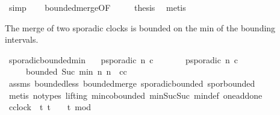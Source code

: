 \begin{isabellebody}
\ simp\isanewline
\ \ \isamarkupfalse%
\ bounded{\isacharunderscore}merge{\isacharbrackleft}OF\ {}\ {}\ {}{\isacharbrackright}\ \isamarkupfalse%
\ {\isacharquery}thesis\ \isamarkupfalse%
\ metis\isanewline
{}\isamarkupfalse%
%
\endisatagproof
{\isafoldproof}%
%
\isadelimproof
%
\endisadelimproof
%
\isadelimdocument
%
\endisadelimdocument
%
\isatagdocument
%
\isamarkuptrue%
%
\endisatagdocument
{\isafolddocument}%
%
\isadelimdocument
%
\endisadelimdocument
%
\begin{isamarkuptext}%
The merge of two sporadic clocks is bounded on the min of the bounding intervals.%
\end{isamarkuptext}\isamarkuptrue%
\isamarkupfalse%
\ sporadic{\isacharunderscore}bounded{\isacharunderscore}min{\isacharcolon}\isanewline
\ \ \ {\isacartoucheopen}p{\isacharunderscore}sporadic\ n\ c{\isacartoucheclose}\isanewline
\ \ \ \ \ \ \ {\isacartoucheopen}p{\isacharunderscore}sporadic\ n{\isacharprime}\ c{\isacharprime}{\isacartoucheclose}\isanewline
\ \ \ \ \ {\isacartoucheopen}bounded\ {\isacharparenleft}Suc\ {\isacharparenleft}min\ n\ n{\isacharprime}{\isacharparenright}{\isacharparenright}\ {}\ {\isacharparenleft}c{\isasymoplus}c{\isacharprime}{\isacharparenright}{\isacartoucheclose}\isanewline
%
\isadelimproof
%
\endisadelimproof
%
\isatagproof
{}\isamarkupfalse%
\ assms\ bounded{\isacharunderscore}less\ bounded{\isacharunderscore}merge\ sporadic{\isacharunderscore}bounded{}\ spor{\isacharunderscore}bounded\isanewline
{}\isamarkupfalse%
\ {\isacharparenleft}metis\ {\isacharparenleft}no{\isacharunderscore}types{\isacharcomma}\ lifting{\isacharparenright}\ min{\isachardot}cobounded{}\ min{\isacharunderscore}Suc{\isacharunderscore}Suc\ min{\isacharunderscore}def\ one{\isacharunderscore}add{\isacharunderscore}one{\isacharparenright}%
\endisatagproof
{\isafoldproof}%
%
\isadelimproof
%
\endisadelimproof
%
\isadelimdocument
%
\endisadelimdocument
%
\isatagdocument
%
\isamarkuptrue%
%
\endisatagdocument
{\isafolddocument}%
%
\isadelimdocument
%
\endisadelimdocument
{}\isamarkupfalse%
\ {\isacartoucheopen}c{}{\isacharcolon}{\isacharcolon}clock\ {\isasymequiv}\ {\isacharparenleft}{\isasymlambda}t{\isachardot}\ t\ {\isasymge}\ {}\ {\isasymand}\ {\isacharparenleft}t{\isacharminus}{}{\isacharparenright}\ mod\ {}\ {\isacharequal}\ {}{\isacharparenright}{\isacartoucheclose}\isanewline

\end{isabellebody}
